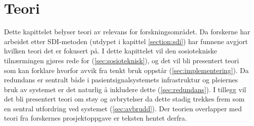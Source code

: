 \chapter{Teori}
\label{chp:teori} 
Dette kapittelet belyser teori av relevans for forskningsområdet. Da forskerne har arbeidet etter SDI-metoden (utdypet i kapittel \ref{section:sdi}) har funnene avgjort hvilken teori det er fokusert på. I dette kapittelet vil den sosiotekniske tilnærmingen gjøres rede for (\ref{sec:sosioteknisk}), og det vil bli presentert teori som kan forklare hvorfor avvik fra tenkt bruk oppstår (\ref{sec:implementering}). Da redundans er sentralt både i pasientsignalsystemets infrastruktur og pleiernes bruk av systemet er det naturlig å inkludere dette (\ref{sec:redundans}). I tillegg vil det bli presentert teori om støy og avbrytelser da dette stadig trekkes frem som en sentral utfordring ved systemet (\ref{sec:avbrudd}). Der teorien overlapper med teori fra forskernes prosjektoppgave \citep{Sund13} er teksten hentet derfra. 


